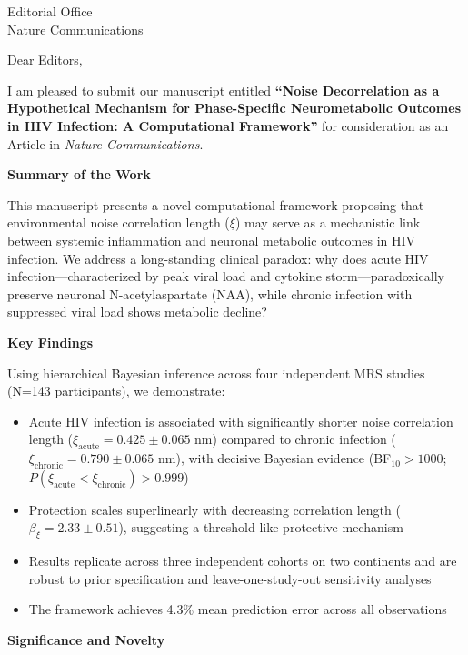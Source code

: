 \documentclass[11pt]{letter}
\begin{document}
\begin{letter}{Editorial Office\\Nature Communications}

\opening{Dear Editors,}

I am pleased to submit our manuscript entitled \textbf{``Noise Decorrelation as a Hypothetical Mechanism for Phase-Specific Neurometabolic Outcomes in HIV Infection: A Computational Framework''} for consideration as an Article in \textit{Nature Communications}.

\textbf{Summary of the Work}

This manuscript presents a novel computational framework proposing that environmental noise correlation length ($\xi$) may serve as a mechanistic link between systemic inflammation and neuronal metabolic outcomes in HIV infection. We address a long-standing clinical paradox: why does acute HIV infection---characterized by peak viral load and cytokine storm---paradoxically preserve neuronal N-acetylaspartate (NAA), while chronic infection with suppressed viral load shows metabolic decline?

\textbf{Key Findings}

Using hierarchical Bayesian inference across four independent MRS studies (N=143 participants), we demonstrate:

\begin{itemize}
    \item Acute HIV infection is associated with significantly shorter noise correlation length ($\xi_{\text{acute}} = 0.425 \pm 0.065$ nm) compared to chronic infection ($\xi_{\text{chronic}} = 0.790 \pm 0.065$ nm), with decisive Bayesian evidence (BF$_{10} > 1000$; $P(\xi_{\text{acute}} < \xi_{\text{chronic}}) > 0.999$)

    \item Protection scales superlinearly with decreasing correlation length ($\beta_\xi = 2.33 \pm 0.51$), suggesting a threshold-like protective mechanism

    \item Results replicate across three independent cohorts on two continents and are robust to prior specification and leave-one-study-out sensitivity analyses

    \item The framework achieves 4.3\% mean prediction error across all observations
\end{itemize}

\textbf{Significance and Novelty}


\end{letter}
\end{document}
